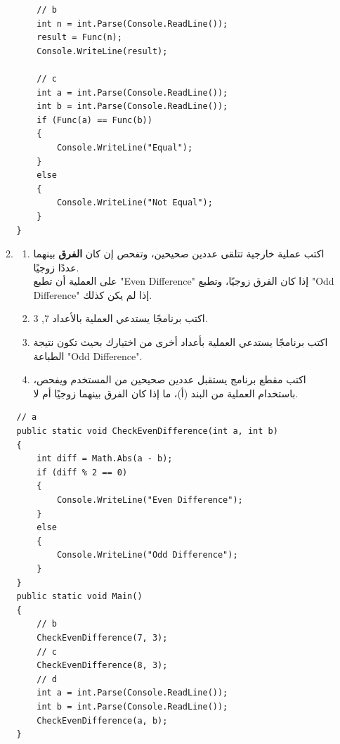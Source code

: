 ﻿\documentclass[12pt]{article}
\begin{document}
\begin{enumerate}[itemsep=3em]
\begin{enumerate}
\begin{boxSolution}
\begin{english}
\begin{verbatim}
    // b
    int n = int.Parse(Console.ReadLine());
    result = Func(n);
    Console.WriteLine(result);

    // c
    int a = int.Parse(Console.ReadLine());
    int b = int.Parse(Console.ReadLine());
    if (Func(a) == Func(b))
    {
        Console.WriteLine("Equal");
    }
    else
    {
        Console.WriteLine("Not Equal");
    }
}
\end{verbatim}
\end{english}
\end{boxSolution}
\clearpage
\fi

\item
\begin{enumerate}
\item اكتب عملية خارجية تتلقى عددين صحيحين، وتفحص إن كان \textbf{الفرق} بينهما عددًا زوجيًا. \\
على العملية أن تطبع \textenglish{"Even Difference"} إذا كان الفرق زوجيًا،
وتطبع \textenglish{"Odd Difference"} إذا لم يكن كذلك.
\item اكتب برنامجًا يستدعي العملية بالأعداد \textenglish{7, 3}.
\item اكتب برنامجًا يستدعي العملية بأعداد أخرى من اختيارك بحيث تكون نتيجة الطباعة \textenglish{"Odd Difference"}.
\item اكتب مقطع برنامج يستقبل عددين صحيحين من المستخدم ويفحص، باستخدام العملية من البند (أ)، ما إذا كان الفرق بينهما زوجيًا أم لا.
\end{enumerate}

\ifwithsols
\begin{boxSolution}
\begin{english}
\begin{verbatim}
// a
public static void CheckEvenDifference(int a, int b)
{
    int diff = Math.Abs(a - b);
    if (diff % 2 == 0)
    {
        Console.WriteLine("Even Difference");
    }
    else
    {
        Console.WriteLine("Odd Difference");
    }
}
public static void Main()
{
    // b
    CheckEvenDifference(7, 3);
    // c
    CheckEvenDifference(8, 3);
    // d
    int a = int.Parse(Console.ReadLine());
    int b = int.Parse(Console.ReadLine());
    CheckEvenDifference(a, b);
}
\end{verbatim}
\end{english}
\end{boxSolution}
\fi


\end{enumerate}
\end{enumerate}
\end{document}
